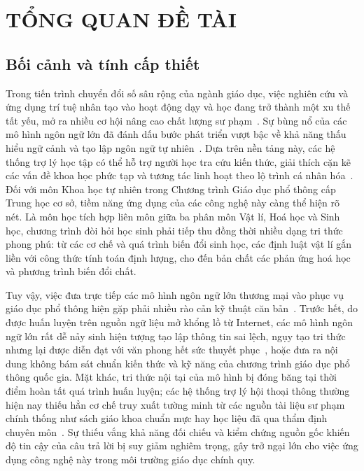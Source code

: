 \chapter{TỔNG QUAN ĐỀ TÀI}
\label{chapter:tong_quan_de_tai}

\section{Bối cảnh và tính cấp thiết}
Trong tiến trình chuyển đổi số sâu rộng của ngành giáo dục, việc nghiên cứu và ứng dụng trí tuệ nhân tạo vào hoạt động dạy và học đang trở thành một xu thế tất yếu, mở ra nhiều cơ hội nâng cao chất lượng sư phạm~\cite{zawacki2019systematic, kasneci2023chatgpt, holmes2019ai, luckin2016intelligence}. Sự bùng nổ của các mô hình ngôn ngữ lớn đã đánh dấu bước phát triển vượt bậc về khả năng thấu hiểu ngữ cảnh và tạo lập ngôn ngữ tự nhiên~\cite{brown2020gpt3, zhao2023llmsurvey}. Dựa trên nền tảng này, các hệ thống trợ lý học tập có thể hỗ trợ người học tra cứu kiến thức, giải thích cặn kẽ các vấn đề khoa học phức tạp và tương tác linh hoạt theo lộ trình cá nhân hóa~\cite{kasneci2023chatgpt}. Đối với môn Khoa học tự nhiên trong Chương trình Giáo dục phổ thông cấp Trung học cơ sở, tiềm năng ứng dụng của các công nghệ này càng thể hiện rõ nét. Là môn học tích hợp liên môn giữa ba phân môn Vật lí, Hoá học và Sinh học, chương trình đòi hỏi học sinh phải tiếp thu đồng thời nhiều dạng tri thức phong phú: từ các cơ chế và quá trình biến đổi sinh học, các định luật vật lí gắn liền với công thức tính toán định lượng, cho đến bản chất các phản ứng hoá học và phương trình biến đổi chất.

Tuy vậy, việc đưa trực tiếp các mô hình ngôn ngữ lớn thương mại vào phục vụ giáo dục phổ thông hiện gặp phải nhiều rào cản kỹ thuật căn bản~\cite{kasneci2023chatgpt}. Trước hết, do được huấn luyện trên nguồn ngữ liệu mở khổng lồ từ Internet, các mô hình ngôn ngữ lớn rất dễ nảy sinh hiện tượng tạo lập thông tin sai lệch, ngụy tạo tri thức nhưng lại được diễn đạt với văn phong hết sức thuyết phục~\cite{ji2023hallucination, huang2023hallucination}, hoặc đưa ra nội dung không bám sát chuẩn kiến thức và kỹ năng của chương trình giáo dục phổ thông quốc gia. Mặt khác, tri thức nội tại của mô hình bị đóng băng tại thời điểm hoàn tất quá trình huấn luyện; các hệ thống trợ lý hội thoại thông thường hiện nay thiếu hẳn cơ chế truy xuất tường minh từ các nguồn tài liệu sư phạm chính thống như sách giáo khoa chuẩn mực hay học liệu đã qua thẩm định chuyên môn~\cite{lewis2020retrieval, gao2023ragsurvey}. Sự thiếu vắng khả năng đối chiếu và kiểm chứng nguồn gốc khiến độ tin cậy của câu trả lời bị suy giảm nghiêm trọng, gây trở ngại lớn cho việc ứng dụng công nghệ này trong môi trường giáo dục chính quy.

